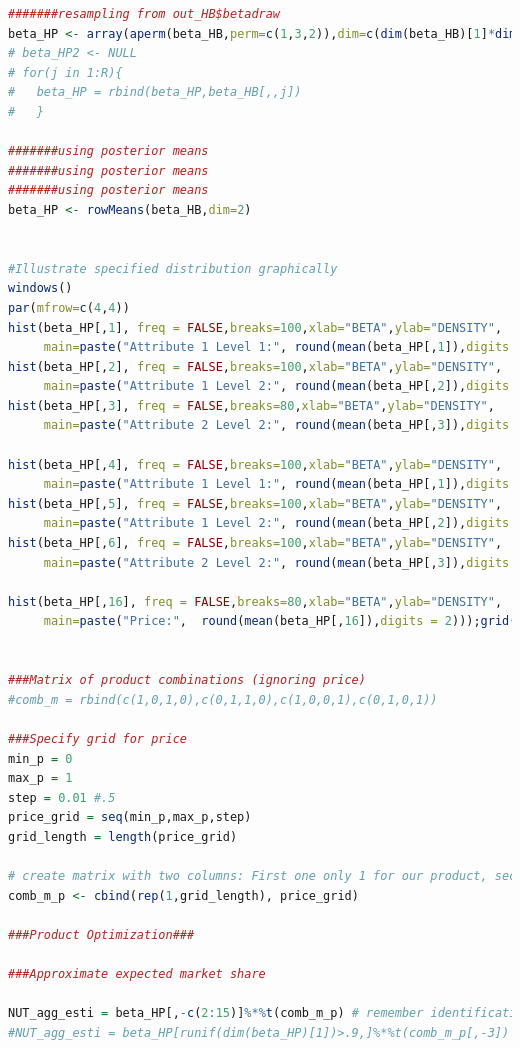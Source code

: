 \documentclass[12pt,a4paper]{article}
\begin{document}
\begin{lstlisting}[language=R,caption={Estimation Code}, label=lst:estim]
#######resampling from out_HB$betadraw
beta_HP <- array(aperm(beta_HB,perm=c(1,3,2)),dim=c(dim(beta_HB)[1]*dim(beta_HB)[3],dim(beta_HB)[2]))
# beta_HP2 <- NULL
# for(j in 1:R){
#   beta_HP = rbind(beta_HP,beta_HB[,,j])
#   }

#######using posterior means
#######using posterior means
#######using posterior means
beta_HP <- rowMeans(beta_HB,dim=2)


#Illustrate specified distribution graphically
windows()
par(mfrow=c(4,4))
hist(beta_HP[,1], freq = FALSE,breaks=100,xlab="BETA",ylab="DENSITY",
     main=paste("Attribute 1 Level 1:", round(mean(beta_HP[,1]),digits = 2)));grid()
hist(beta_HP[,2], freq = FALSE,breaks=100,xlab="BETA",ylab="DENSITY",
     main=paste("Attribute 1 Level 2:", round(mean(beta_HP[,2]),digits = 2)));grid()
hist(beta_HP[,3], freq = FALSE,breaks=80,xlab="BETA",ylab="DENSITY",
     main=paste("Attribute 2 Level 2:", round(mean(beta_HP[,3]),digits = 2)));grid()

hist(beta_HP[,4], freq = FALSE,breaks=100,xlab="BETA",ylab="DENSITY",
     main=paste("Attribute 1 Level 1:", round(mean(beta_HP[,1]),digits = 2)));grid()
hist(beta_HP[,5], freq = FALSE,breaks=100,xlab="BETA",ylab="DENSITY",
     main=paste("Attribute 1 Level 2:", round(mean(beta_HP[,2]),digits = 2)));grid()
hist(beta_HP[,6], freq = FALSE,breaks=100,xlab="BETA",ylab="DENSITY",
     main=paste("Attribute 2 Level 2:", round(mean(beta_HP[,3]),digits = 2)));grid()

hist(beta_HP[,16], freq = FALSE,breaks=80,xlab="BETA",ylab="DENSITY",
     main=paste("Price:",  round(mean(beta_HP[,16]),digits = 2)));grid()


###Matrix of product combinations (ignoring price)
#comb_m = rbind(c(1,0,1,0),c(0,1,1,0),c(1,0,0,1),c(0,1,0,1))

###Specify grid for price
min_p = 0
max_p = 1 
step = 0.01 #.5
price_grid = seq(min_p,max_p,step)
grid_length = length(price_grid)

# create matrix with two columns: First one only 1 for our product, second one price grid
comb_m_p <- cbind(rep(1,grid_length), price_grid)

###Product Optimization###

###Approximate expected market share 

NUT_agg_esti = beta_HP[,-c(2:15)]%*%t(comb_m_p) # remember identification of the choice likelihood? 
#NUT_agg_esti = beta_HP[runif(dim(beta_HP)[1])>.9,]%*%t(comb_m_p[,-3]) # without (randomized) subsetting the object will be too big for the workspace


\end{lstlisting}
\end{document}
